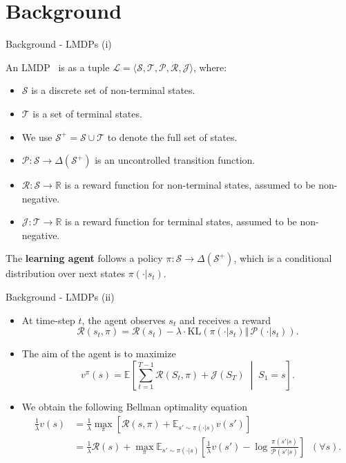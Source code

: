 \documentclass{beamer}
\theoremstyle{mystyle}
\newcommand{\cJ}{\mathcal{J}}
\newcommand{\cL}{\mathcal{L}}
\newcommand{\cP}{\mathcal{P}}
\newcommand{\cR}{\mathcal{R}}
\newcommand{\cS}{\mathcal{S}}
\newcommand{\cT}{\mathcal{T}}
\newcommand{\EEc}[2]{\mathbb{E}\left[#1\;\middle\lvert\;#2\right]}
\newcommand{\real}{\mathbb{R}}
\begin{document}
\section{Background}
\begin{frame}{Background - LMDPs (i)}

    An LMDP~\citep{KappenML2012,TodorovNIPS2007} is as a tuple $\cL=\langle\cS,\cT,\cP,\cR,\cJ\rangle$, where:
    
    \begin{itemize}
        \item  $\cS$ is a discrete set of non-terminal states.
        \item $\cT$ is a set of terminal states.
        \item We use $\cS^+=\cS\cup\cT$ to denote the full set of states.
        \item $\cP:\cS\rightarrow\Delta(\cS^+)$ is an uncontrolled transition function.
        \item $\cR:\cS\rightarrow\real$ is a reward function for non-terminal states, assumed to be non-negative.
        \item $\cJ:\cT\rightarrow\real$ is a reward function for terminal states, assumed to be non-negative.

    \end{itemize}
    
    The \textbf{learning agent} follows a policy $\pi:\cS\rightarrow\Delta(\cS^+)$, which is a conditional distribution over next states $\pi(\cdot | s_t)$.
\end{frame}


\begin{frame}{Background - LMDPs (ii)}
    
    \begin{itemize}

        \item At time-step $t$, the agent observes $s_t$ and receives a reward \[ \cR(s_t,\pi) = \cR(s_t) - \lambda\cdot\mathrm{KL}(\pi(\cdot|s_t)\Vert\, \cP(\cdot|s_t)). \]

        \item The aim of the agent is to maximize \[ v^\pi(s) = \EEc{\sum_{t=1}^{T-1} \cR(S_t,\pi) + \cJ(S_T)}{S_1 = s}.\]
        
       \item We obtain the following Bellman optimality equation 
       \begin{align*}
            \frac 1 \lambda v(s) &= \frac 1 \lambda \max_\pi \left[ \cR(s,\pi) + \mathbb{E}_{s'\sim\pi(\cdot|s)} v(s') \right]\\
             &= \frac 1 \lambda \cR(s) + \max_\pi \mathbb{E}_{s'\sim\pi(\cdot|s)} \left[ \frac 1 \lambda v(s') - \log \frac {\pi(s'|s)} {\cP(s'|s)} \right] \;\; (\forall s).
        \end{align*}

    \end{itemize}
\end{frame}
\end{document}

